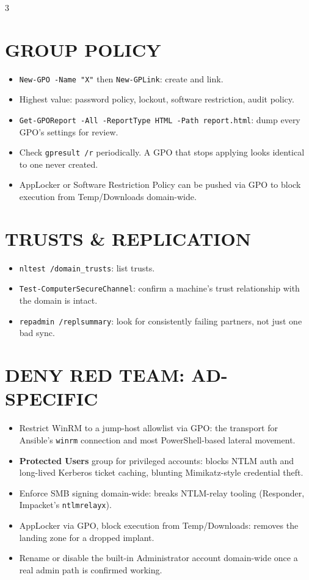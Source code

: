 \documentclass[7pt,landscape]{article}
\begin{document}
\begin{multicols*}{3}
\section{GROUP POLICY}
\begin{itemize}
    \item \texttt{New-GPO -Name "X"} then \texttt{New-GPLink}: create and link.
    \item Highest value: password policy, lockout, software restriction, audit policy.
    \item \texttt{Get-GPOReport -All -ReportType HTML -Path report.html}: dump every GPO's settings for review.
    \item Check \texttt{gpresult /r} periodically. A GPO that stops applying looks identical to one never created.
    \item AppLocker or Software Restriction Policy can be pushed via GPO to block execution from Temp/Downloads domain-wide.
\end{itemize}

\section{TRUSTS \& REPLICATION}
\begin{itemize}
    \item \texttt{nltest /domain\_trusts}: list trusts.
    \item \texttt{Test-ComputerSecureChannel}: confirm a machine's trust relationship with the domain is intact.
    \item \texttt{repadmin /replsummary}: look for consistently failing partners, not just one bad sync.
\end{itemize}

\section{DENY RED TEAM: AD-SPECIFIC}
\begin{itemize}
    \item Restrict WinRM to a jump-host allowlist via GPO: the transport for Ansible's \texttt{winrm} connection and most PowerShell-based lateral movement.
    \item \textbf{Protected Users} group for privileged accounts: blocks NTLM auth and long-lived Kerberos ticket caching, blunting Mimikatz-style credential theft.
    \item Enforce SMB signing domain-wide: breaks NTLM-relay tooling (Responder, Impacket's \texttt{ntlmrelayx}).
    \item AppLocker via GPO, block execution from Temp/Downloads: removes the landing zone for a dropped implant.
    \item Rename or disable the built-in Administrator account domain-wide once a real admin path is confirmed working.
\end{itemize}


\end{multicols*}
\end{document}
